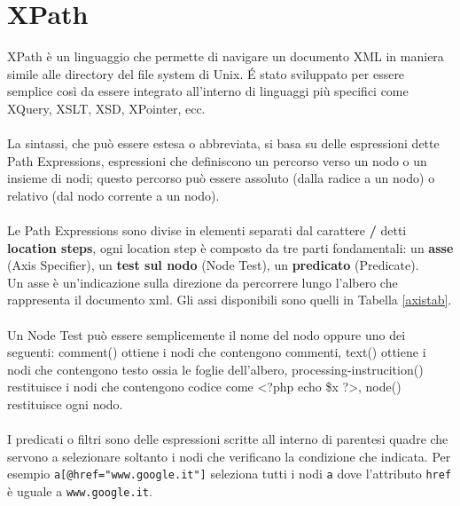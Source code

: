 \section{XPath}
XPath è un linguaggio che permette di navigare un documento XML in maniera simile alle directory del file system di Unix. \'{E} stato sviluppato per essere semplice così da essere integrato all'interno di linguaggi più specifici come XQuery, XSLT, XSD, XPointer, ecc.
\\\\
La sintassi, che può essere estesa o abbreviata, si basa su delle espressioni dette Path Expressions, espressioni che definiscono un percorso verso un nodo o un insieme di nodi; questo percorso può essere assoluto (dalla radice a un nodo) o relativo (dal nodo corrente a un nodo).
\\\\
Le Path Expressions sono divise in elementi separati dal carattere \textbf{/} detti \textbf{location steps}, ogni location step è composto da tre parti fondamentali: un \textbf{asse} (Axis Specifier), un \textbf{test sul nodo} (Node Test), un \textbf{predicato} (Predicate).\\
Un asse è un'indicazione sulla direzione da percorrere lungo l'albero che rappresenta il documento xml. Gli assi disponibili sono quelli in Tabella \ref{axistab}.
\\\\
Un Node Test può essere semplicemente il nome del nodo oppure uno dei seguenti: comment() ottiene i nodi che contengono commenti, text() ottiene i nodi che contengono testo ossia le foglie dell'albero, processing-instrucition() restituisce i nodi che contengono codice come <?php echo \$x ?>, node() restituisce ogni nodo.
\\\\
I predicati o filtri sono delle espressioni scritte all interno di parentesi quadre che servono a selezionare soltanto i nodi che verificano la condizione che indicata. Per esempio \texttt{a[@href="www.google.it"]} seleziona tutti i nodi \texttt{a} dove l'attributo \texttt{href} è uguale a \texttt{www.google.it}.
